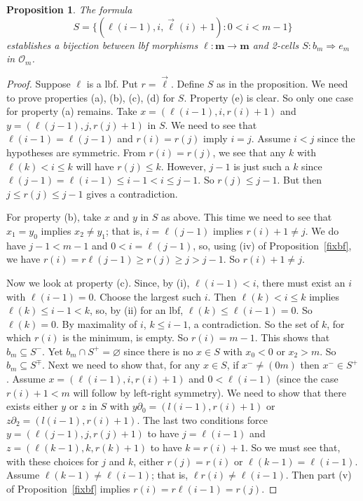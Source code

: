\documentclass[a4paper,12pt,reqno]{amsart}
\newtheorem{proposition}[theorem]{Proposition}
\theoremstyle{definition}
\theoremstyle{fact}
\theoremstyle{genquest}
\theoremstyle{step}
\newcommand{\lra}{\longrightarrow}
\newcommand{\Lra}{\Longrightarrow}
\newcommand{\ora}{\overrightarrow}
\def\CO{{\mathscr O}}
\begin{document}
\begin{proposition}\label{Sbijlbf} 
The formula
$$S=\{(\ell(i-1), i , \ora{\ell}(i)+1) : 0<i<m-1\}$$
establishes a bijection between lbf morphisms $\ell : \mathbf{m} \lra \mathbf{m}$ 
and  2-cells $S:b_m \Lra e_m$ in $\CO_m$. 
\end{proposition}
\begin{proof}
Suppose $\ell$ is a lbf. Put $r=\ora{\ell}$. 
Define $S$ as in the proposition. 
We need to prove properties (a), (b), (c), (d) for $S$.
Property (e) is clear. So only one case for property (a) remains. 
Take $x=(\ell(i-1), i , r(i)+1)$
and $y=(\ell(j-1), j , r(j)+1)$ in $S$. We need to see that 
$\ell (i-1) = \ell (j-1)$ and $r(i)=r(j)$ imply $i=j$.
Assume $i<j$ since the hypotheses are symmetric.
From $r(i)=r(j)$, we see that any $k$ with
$\ell (k) < i \le k$ will have $r (j) \le k$. However, $j-1$ is just such
a $k$ since $\ell (j-1) = \ell (i-1) \le i-1 < i \le j-1$. So $r (j) \le j-1$.
But then $j \le r(j) \le j-1$ gives a contradiction.   

For property (b), take $x$ and $y$ in $S$ as above. 
This time we need to see that $x_1=y_0$ implies $x_2\neq y_1$;
that is, $i=\ell(j-1)$ implies $r(i)+1\neq j$. We do have
$j-1<m-1$ and $0<i=\ell(j-1)$, so, using (iv) of Proposition~\ref{fixbf},
we have $r(i)=r\ell (j-1) \ge r(j) \ge j > j-1$. So $r(i)+1\neq j$.  

Now we look at property (c). Since, by (i), $\ell(i-1) < i$, there must exist an 
$i$ with $\ell (i-1) = 0$.
Choose the largest such $i$. Then $\ell(k)<i\le k$ implies $\ell(k) \le i-1 <k$,
so, by (ii) for an lbf, $\ell(k) \le \ell(i-1)=0$. So $\ell(k)=0$. 
By maximality of $i$, $k\le i-1$, a contradiction. 
So the set of $k$, for which $r(i)$ is the minimum, is empty.
So $r(i) =m-1$. This shows that $b_m\subseteq S^-$.
Yet $b_m\cap S^+=\varnothing$ since there is no $x\in S$
with $x_0<0$ or $x_2>m$. 
So $b_m\subseteq S^{\mp}$.
Next we need to show that, for any $x\in S$, if $x^-\neq (0m)$ then $x^- \in S^+$.
Assume $x=(\ell(i-1), i , r(i)+1)$ and $0< \ell(i-1)$ (since the case
$r(i)+1<m$ will follow by left-right symmetry). 
We need to show that there exists either $y$ or $z$ in $S$ with
$y\partial_0 = (l(i-1),r(i)+1)$ or $z\partial_2 = (l(i-1),r(i)+1)$.
The last two conditions force $y=(\ell(j-1),j, r(j)+1)$ to have $j=\ell(i-1)$
and $z=(\ell(k-1),k, r(k)+1)$ to have $k=r(i)+1$. So we must see that,
with these choices for $j$ and $k$, either  $r(j)=r(i)$ or $\ell(k-1)=\ell(i-1)$.
Assume $\ell(k-1)\neq \ell(i-1)$; that is, $\ell r (i) \neq \ell(i-1)$. 
Then part (v) of Proposition~\ref{fixbf} implies $r(i)=r\ell(i-1)=r(j)$.


\end{proof}
\end{document}
